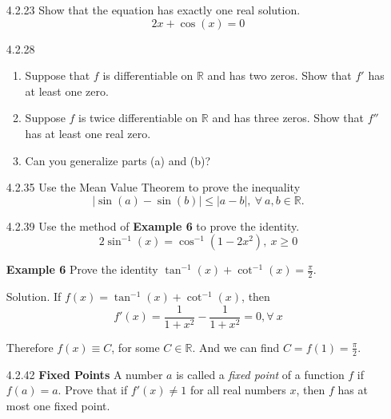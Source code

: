 \documentclass{article}
\begin{document}
\begin{enumerate}
\item[4.2.23]
    Show that the equation has exactly one real solution.
    \[
        2x + \cos (x) = 0
    \]

\vspace{5cm}

\item[4.2.28]
    \begin{enumerate}
        \item
            Suppose that $f$ is differentiable on $\mathbb{R}$ and has two zeros.
            Show that $f'$ has at least one zero.
        \item
            Suppose $f$ is twice differentiable on $\mathbb{R}$ and
            has three zeros. Show that $f''$ has at least one
            real zero.
        \item
            Can you generalize parts (a) and (b)?
    \end{enumerate}

\vspace{6cm}

\item[4.2.35]
    Use the Mean Value Theorem to prove the inequality
    \[
        | \sin (a) - \sin (b) | \leqslant | a - b |,\ \forall\ a, b \in \mathbb{R}.
    \]

\newpage

\item[4.2.39]
    Use the method of \textbf{Example 6} to prove the identity.
    \[
        2 \sin^{-1} (x) = \cos^{-1} (1 - 2x^{2}),\ x \geqslant 0
    \]

    \begin{tcolorbox}
        \textbf{Example 6} Prove the identity $ \displaystyle  \tan^{-1} (x) + \cot^{-1} (x) = \frac{\pi}{2}$.

        Solution. If $f(x) = \tan^{-1} (x) + \cot^{-1} (x)$, then
        \[
            f'(x) = \frac{1}{1+x^{2}} - \frac{1}{1+x^{2}} = 0, \forall\ x
        \]

        Therefore $f(x)  \equiv C$, for some $C \in \mathbb{R}$. And we can find $C = f(1) = \frac{\pi}{2}$.
    \end{tcolorbox}

\vspace{8cm}

\item[4.2.42]
    \textbf{Fixed Points} A number $a$ is called a \textit{fixed point}
    of a function $f$ if $f(a)=a$. Prove that if $f'(x) \neq 1$
    for all real numbers $x$, then $f$ has at most one
    fixed point.


\end{enumerate}
\end{document}
